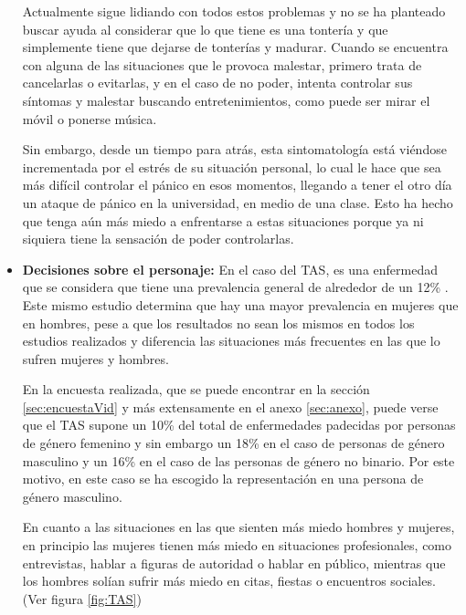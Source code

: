 \documentclass[12pt, a4paper,twoside,titlepage]{book}
\begin{document}
\begin{itemize}
{    Actualmente sigue lidiando con todos estos problemas y no se ha planteado buscar ayuda al considerar que lo que tiene es una tontería y que simplemente tiene que dejarse de tonterías y madurar. Cuando se encuentra con alguna de las situaciones que le provoca malestar, primero trata de cancelarlas o evitarlas, y en el caso de no poder, intenta controlar sus síntomas y malestar buscando entretenimientos, como puede ser mirar el móvil o ponerse música. 
    
    Sin embargo, desde un tiempo para atrás, esta sintomatología está viéndose incrementada por el estrés de su situación personal, lo cual le hace que sea más difícil controlar el pánico en esos momentos, llegando a tener el otro día un ataque de pánico en la universidad, en medio de una clase. Esto ha hecho que tenga aún más miedo a enfrentarse a estas situaciones porque ya ni siquiera tiene la sensación de poder controlarlas. 
    }
    
     \item {\textbf{Decisiones sobre el personaje:}
     En el caso del TAS, es una enfermedad que se considera que tiene una prevalencia general de alrededor de un 12\% \cite{articuloTAS}. Este mismo estudio determina que hay una mayor prevalencia en mujeres que en hombres, pese a que los resultados no sean los mismos en todos los estudios realizados y diferencia las situaciones más frecuentes en las que lo sufren mujeres y hombres. 
     
     En la encuesta realizada, que se puede encontrar en la sección \ref{sec:encuestaVid} y más extensamente en el anexo \ref{sec:anexo}, puede verse que el TAS supone un 10\% del total de enfermedades padecidas por personas de género femenino y sin embargo un 18\% en el caso de personas de género masculino y un 16\% en el caso de las personas de género no binario. Por este motivo, en este caso se ha escogido la representación en una persona de género masculino. 
     
     
En cuanto a las situaciones en las que sienten más miedo hombres y mujeres, en principio las mujeres tienen más miedo en situaciones profesionales, como entrevistas, hablar a figuras de autoridad o hablar en público, mientras que los hombres solían sufrir más miedo en citas, fiestas o encuentros sociales. (Ver figura \ref{fig:TAS})

}
\end{itemize}
\end{document}
